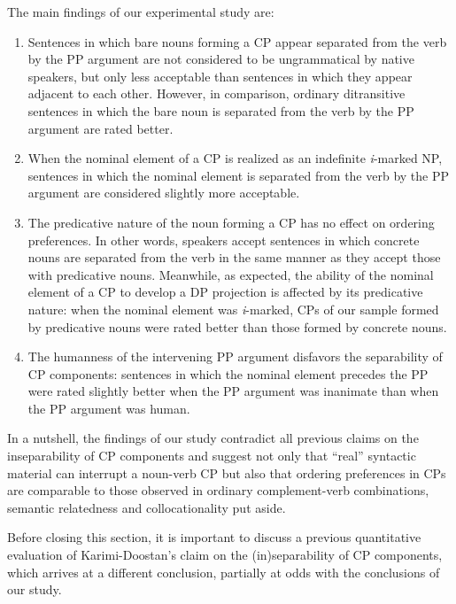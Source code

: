 \documentclass[output=paper]{langsci/langscibook}
\begin{document}
The main findings of our experimental study are:

\begin{enumerate}
	\item Sentences in which bare nouns forming a CP appear separated from the verb by the PP argument are not considered to be ungrammatical by native speakers, but only less acceptable than sentences in which they appear adjacent to each other. 
	However, in comparison, ordinary ditransitive sentences in which the bare noun is separated from the verb by the PP argument are rated better.
	
	\item When the nominal element of a CP is realized as an indefinite \textit{i}-marked NP, sentences in which the nominal element is separated from the verb by the PP argument are considered slightly more acceptable.
	
	\item The predicative nature of the noun forming a CP has no effect on ordering preferences. In other words, speakers accept sentences in which concrete nouns are separated from the verb in the same manner as they accept those with predicative nouns. 
	Meanwhile, as expected, the ability of the nominal element of a CP to develop a DP projection is affected by its predicative nature: when the nominal element was \textit{i}-marked, CPs of our sample formed by predicative nouns were rated better than those formed by concrete nouns.
	
	\item The humanness of the intervening PP argument disfavors the separability of CP components: sentences in which the nominal element precedes the PP were rated slightly better when the PP argument was inanimate than when the PP argument was human.
\end{enumerate}

In a nutshell, the findings of our study contradict all previous claims on the inseparability of CP components \citep[e.g.][]{Goldberg1996,Karimi-Doostan1997,Karimi-Doostan:2011} and suggest not only that ``real'' syntactic material can interrupt a noun-verb CP but also that ordering preferences in CPs are comparable to those observed in ordinary complement-verb combinations, semantic relatedness and collocationality put aside. 

Before closing this section, it is important to discuss a previous quantitative evaluation of Karimi-Doostan's claim on the (in)separability of CP components, which arrives at a different conclusion, partially at odds with the conclusions of our study.
\end{document}
